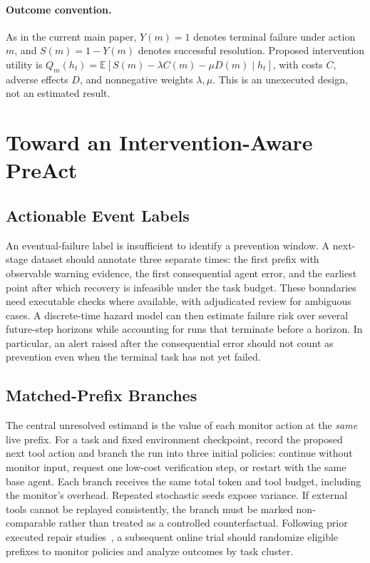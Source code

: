 \paragraph{Outcome convention.} As in the current main paper, $Y(m)=1$ denotes terminal failure under action $m$, and $S(m)=1-Y(m)$ denotes successful resolution. Proposed intervention utility is $Q_m(h_t)=\mathbb{E}[S(m)-\lambda C(m)-\mu D(m)\mid h_t]$, with costs $C$, adverse effects $D$, and nonnegative weights $\lambda,\mu$. This is an unexecuted design, not an estimated result.
\section{Toward an Intervention-Aware PreAct}
\label{sec:toward-an-intervention-aware-preact}
\subsection{Actionable Event Labels}
An eventual-failure label is insufficient to identify a prevention window. A next-stage dataset should annotate three separate times: the first prefix with observable warning evidence, the first consequential agent error, and the earliest point after which recovery is infeasible under the task budget. These boundaries need executable checks where available, with adjudicated review for ambiguous cases. A discrete-time hazard model can then estimate failure risk over several future-step horizons while accounting for runs that terminate before a horizon. In particular, an alert raised after the consequential error should not count as prevention even when the terminal task has not yet failed.

\subsection{Matched-Prefix Branches}
The central unresolved estimand is the value of each monitor action at the \emph{same} live prefix. For a task and fixed environment checkpoint, record the proposed next tool action and branch the run into three initial policies: continue without monitor input, request one low-cost verification step, or restart with the same base agent. Each branch receives the same total token and tool budget, including the monitor's overhead. Repeated stochastic seeds expose variance. If external tools cannot be replayed consistently, the branch must be marked non-comparable rather than treated as a controlled counterfactual. Following prior executed repair studies~\cite{sentinel,dover}, a subsequent online trial should randomize eligible prefixes to monitor policies and analyze outcomes by task cluster.


